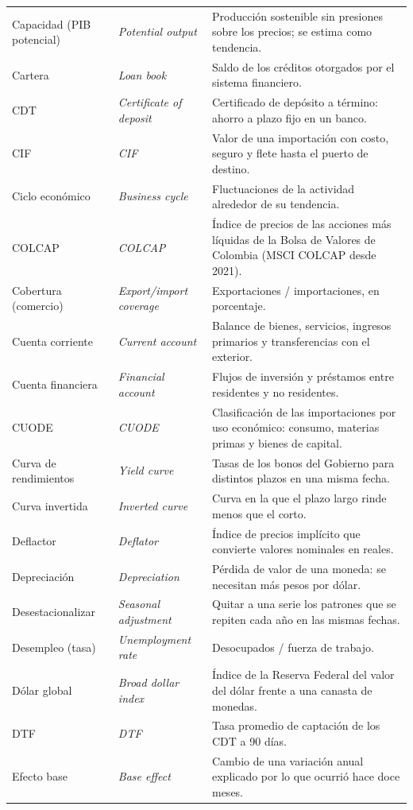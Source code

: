 \begin{longtable}{>{\raggedright\arraybackslash}p{3.2cm}>{\raggedright\arraybackslash\itshape}p{3.2cm}>{\raggedright\arraybackslash}p{8.2cm}}
Capacidad (PIB potencial) & Potential output & Producción sostenible sin presiones sobre los precios; se estima como tendencia.\\
Cartera & Loan book & Saldo de los créditos otorgados por el sistema financiero.\\
CDT & Certificate of deposit & Certificado de depósito a término: ahorro a plazo fijo en un banco.\\
CIF & CIF & Valor de una importación con costo, seguro y flete hasta el puerto de destino.\\
Ciclo económico & Business cycle & Fluctuaciones de la actividad alrededor de su tendencia.\\
COLCAP & COLCAP & Índice de precios de las acciones más líquidas de la Bolsa de Valores de Colombia (MSCI COLCAP desde 2021).\\
Cobertura (comercio) & Export/import coverage & Exportaciones / importaciones, en porcentaje.\\
Cuenta corriente & Current account & Balance de bienes, servicios, ingresos primarios y transferencias con el exterior.\\
Cuenta financiera & Financial account & Flujos de inversión y préstamos entre residentes y no residentes.\\
CUODE & CUODE & Clasificación de las importaciones por uso económico: consumo, materias primas y bienes de capital.\\
Curva de rendimientos & Yield curve & Tasas de los bonos del Gobierno para distintos plazos en una misma fecha.\\
Curva invertida & Inverted curve & Curva en la que el plazo largo rinde menos que el corto.\\
Deflactor & Deflator & Índice de precios implícito que convierte valores nominales en reales.\\
Depreciación & Depreciation & Pérdida de valor de una moneda: se necesitan más pesos por dólar.\\
Desestacionalizar & Seasonal adjustment & Quitar a una serie los patrones que se repiten cada año en las mismas fechas.\\
Desempleo (tasa) & Unemployment rate & Desocupados / fuerza de trabajo.\\
Dólar global & Broad dollar index & Índice de la Reserva Federal del valor del dólar frente a una canasta de monedas.\\
DTF & DTF & Tasa promedio de captación de los CDT a 90 días.\\
Efecto base & Base effect & Cambio de una variación anual explicado por lo que ocurrió hace doce meses.\\

\end{longtable}
